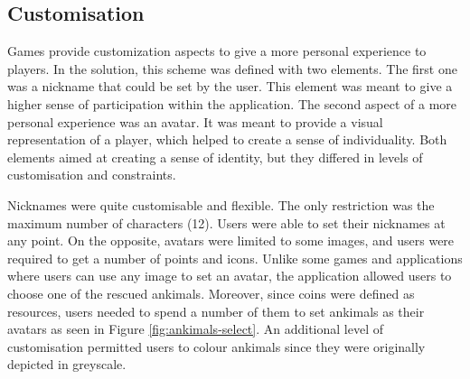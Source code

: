 \subsection{Customisation}
Games provide customization aspects to give a more personal experience to players. In the solution, this scheme was defined with two elements. The first one was a nickname that could be set by the user. This element was meant to give a higher sense of participation within the application. The second aspect of a more personal experience was an avatar. It was meant to provide a visual representation of a player, which helped to create a sense of individuality. Both elements aimed at creating a sense of identity, but they differed in levels of customisation and constraints.

Nicknames were quite customisable and flexible. The only restriction was the maximum number of characters (12). Users were able to set their nicknames at any point. On the opposite, avatars were limited to some images, and users were required to get a number of points and icons. Unlike some games and applications where users can use any image to set an avatar, the application allowed users to choose one of the rescued ankimals. Moreover, since coins were defined as resources, users needed to spend a number of them to set ankimals as their avatars as seen in Figure \ref{fig:ankimals-select}. An additional level of customisation permitted users to colour ankimals since they were originally depicted in greyscale.

